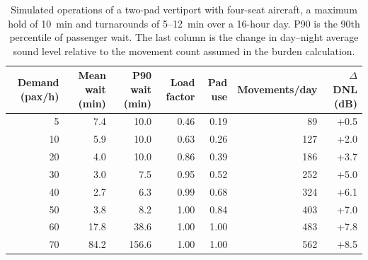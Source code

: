 \begin{table}[!htbp]
\centering
\caption{Simulated operations of a two-pad vertiport with four-seat aircraft, a maximum hold of 10~min and turnarounds of 5--12~min over a 16-hour day. P90 is the 90th percentile of passenger wait. The last column is the change in day--night average sound level relative to the movement count assumed in the burden calculation.}
\label{tab:operations}
\footnotesize
\begin{tabular}{rrrrrrr}
\toprule
Demand (pax/h) & Mean wait (min) & P90 wait (min) & Load factor & Pad use & Movements/day & $\Delta$DNL (dB) \\
\midrule
5 & 7.4 & 10.0 & 0.46 & 0.19 & 89 & +0.5 \\
10 & 5.9 & 10.0 & 0.63 & 0.26 & 127 & +2.0 \\
20 & 4.0 & 10.0 & 0.86 & 0.39 & 186 & +3.7 \\
30 & 3.0 & 7.5 & 0.95 & 0.52 & 252 & +5.0 \\
40 & 2.7 & 6.3 & 0.99 & 0.68 & 324 & +6.1 \\
50 & 3.8 & 8.2 & 1.00 & 0.84 & 403 & +7.0 \\
60 & 17.8 & 38.6 & 1.00 & 1.00 & 483 & +7.8 \\
70 & 84.2 & 156.6 & 1.00 & 1.00 & 562 & +8.5 \\
\bottomrule
\end{tabular}
\end{table}

